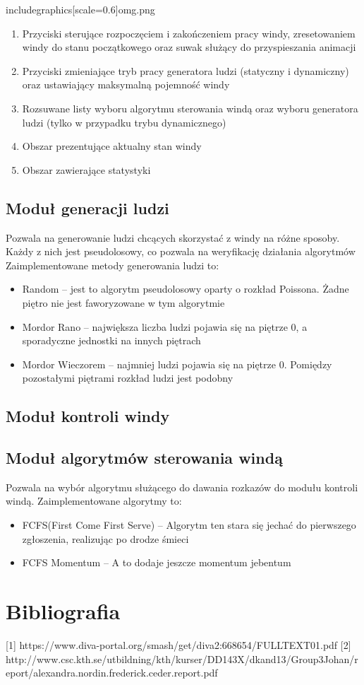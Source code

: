\documentclass[a4paper,11pt]{article}
\begin{document}
includegraphics[scale=0.6]{omg.png}\\

\begin{enumerate}
	\item Przyciski sterujące rozpoczęciem i zakończeniem pracy windy, zresetowaniem windy do stanu początkowego oraz suwak służący do przyspieszania animacji
	\item Przyciski zmieniające tryb pracy generatora ludzi (statyczny i dynamiczny) oraz ustawiający maksymalną pojemność windy
	\item Rozsuwane listy wyboru algorytmu sterowania windą oraz wyboru generatora ludzi (tylko w przypadku trybu dynamicznego)
	\item Obszar prezentujące aktualny stan windy
	\item Obszar zawierające statystyki
\end{enumerate}
\subsection{Moduł generacji ludzi}
Pozwala na generowanie ludzi chcących skorzystać z windy na różne sposoby. Każdy z nich jest pseudolosowy, co pozwala na weryfikację działania algorytmów  Zaimplementowane metody generowania ludzi to:
\begin{itemize}
	\item Random -- jest to algorytm pseudolosowy oparty o rozkład Poissona. Żadne piętro nie jest faworyzowane w tym algorytmie
	\item Mordor Rano -- największa liczba ludzi pojawia się na piętrze 0, a sporadyczne jednostki na innych piętrach
	\item Mordor Wieczorem -- najmniej ludzi pojawia się na piętrze 0. Pomiędzy pozostałymi piętrami rozkład ludzi jest podobny
\end{itemize}
\subsection{Moduł kontroli windy}
\subsection{Moduł algorytmów sterowania windą}
Pozwala na wybór algorytmu służącego do dawania rozkazów do modułu kontroli windą. Zaimplementowane algorytmy to:
\begin{itemize}
	\item FCFS(First Come First Serve) -- Algorytm ten stara się jechać do pierwszego zgłoszenia, realizując po drodze śmieci
	\item FCFS Momentum -- A to dodaje jeszcze momentum jebentum
\end{itemize}

\section{Bibliografia}
[1] https://www.diva-portal.org/smash/get/diva2:668654/FULLTEXT01.pdf
[2] http://www.csc.kth.se/utbildning/kth/kurser/DD143X/dkand13/Group3Johan/report/alexandra.nordin.frederick.ceder.report.pdf
\end{document}
